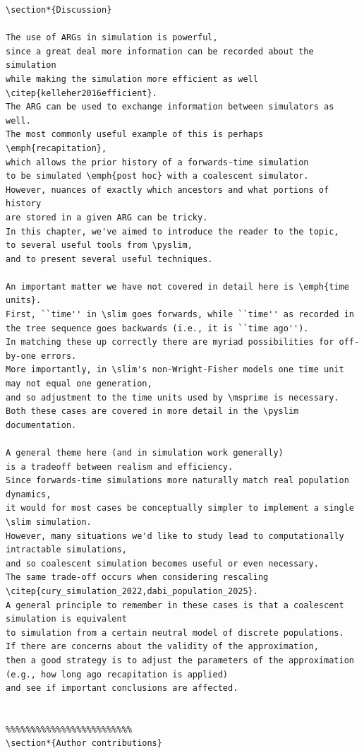 \documentclass[12pt]{article}
\newcommand{\msprime}[0]{\texttt{msprime}\xspace}
\newcommand{\slim}[0]{\texttt{SLiM}\xspace}
\newcommand{\pyslim}[0]{\texttt{pyslim}\xspace}
\begin{document}
\begin{lstlisting}[language=slim]
%%%%%%%%%%%%%%%%%%%%%%%%%
\section*{Discussion}

The use of ARGs in simulation is powerful,
since a great deal more information can be recorded about the simulation
while making the simulation more efficient as well \citep{kelleher2016efficient}.
The ARG can be used to exchange information between simulators as well.
The most commonly useful example of this is perhaps \emph{recapitation},
which allows the prior history of a forwards-time simulation
to be simulated \emph{post hoc} with a coalescent simulator.
However, nuances of exactly which ancestors and what portions of history
are stored in a given ARG can be tricky.
In this chapter, we've aimed to introduce the reader to the topic,
to several useful tools from \pyslim,
and to present several useful techniques.

An important matter we have not covered in detail here is \emph{time units}.
First, ``time'' in \slim goes forwards, while ``time'' as recorded in the tree sequence goes backwards (i.e., it is ``time ago'').
In matching these up correctly there are myriad possibilities for off-by-one errors.
More importantly, in \slim's non-Wright-Fisher models one time unit may not equal one generation,
and so adjustment to the time units used by \msprime is necessary.
Both these cases are covered in more detail in the \pyslim documentation.

A general theme here (and in simulation work generally)
is a tradeoff between realism and efficiency.
Since forwards-time simulations more naturally match real population dynamics,
it would for most cases be conceptually simpler to implement a single \slim simulation.
However, many situations we'd like to study lead to computationally intractable simulations,
and so coalescent simulation becomes useful or even necessary.
The same trade-off occurs when considering rescaling \citep{cury_simulation_2022,dabi_population_2025}.
A general principle to remember in these cases is that a coalescent simulation is equivalent
to simulation from a certain neutral model of discrete populations.
If there are concerns about the validity of the approximation,
then a good strategy is to adjust the parameters of the approximation (e.g., how long ago recapitation is applied)
and see if important conclusions are affected.


%%%%%%%%%%%%%%%%%%%%%%%%%
\section*{Author contributions}



\end{lstlisting}
\end{document}
